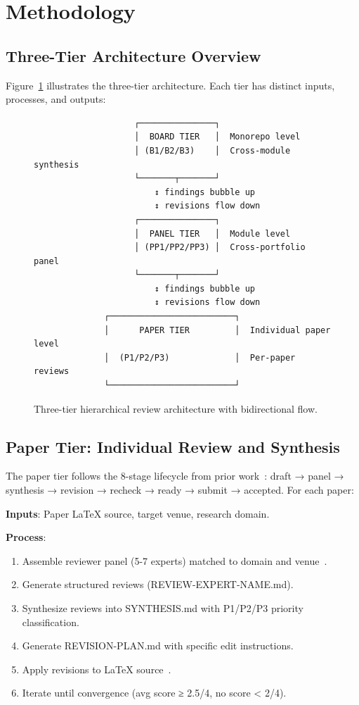 \section{Methodology}
\label{sec:method}

\subsection{Three-Tier Architecture Overview}

Figure~\ref{fig:architecture} illustrates the three-tier architecture. Each tier has distinct inputs, processes, and outputs:

\begin{figure}[t]
\centering
\begin{verbatim}
                    ┌───────────────┐
                    │  BOARD TIER   │  Monorepo level
                    │ (B1/B2/B3)    │  Cross-module synthesis
                    └───────┬───────┘
                        ↕ findings bubble up
                        ↕ revisions flow down
                    ┌───────────────┐
                    │  PANEL TIER   │  Module level
                    │ (PP1/PP2/PP3) │  Cross-portfolio panel
                    └───────┬───────┘
                        ↕ findings bubble up
                        ↕ revisions flow down
              ┌─────────────────────────┐
              │      PAPER TIER         │  Individual paper level
              │  (P1/P2/P3)             │  Per-paper reviews
              └─────────────────────────┘
\end{verbatim}
\caption{Three-tier hierarchical review architecture with bidirectional flow.}
\label{fig:architecture}
\end{figure}

\subsection{Paper Tier: Individual Review and Synthesis}

The paper tier follows the 8-stage lifecycle from prior work~\cite{dellalibera2026review}: draft → panel → synthesis → revision → recheck → ready → submit → accepted. For each paper:

\textbf{Inputs}: Paper LaTeX source, target venue, research domain.

\textbf{Process}:
\begin{enumerate}
\item Assemble reviewer panel (5-7 experts) matched to domain and venue~\cite{dellalibera2026calibration}.
\item Generate structured reviews (REVIEW-EXPERT-NAME.md).
\item Synthesize reviews into SYNTHESIS.md with P1/P2/P3 priority classification.
\item Generate REVISION-PLAN.md with specific edit instructions.
\item Apply revisions to LaTeX source~\cite{dellalibera2026dynamics}.
\item Iterate until convergence (avg score ≥ 2.5/4, no score < 2/4).
\end{enumerate}

